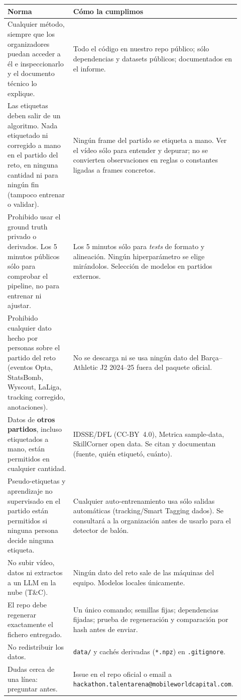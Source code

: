 \documentclass[11pt,a4paper]{article}
\begin{document}
\begin{longtable}{p{0.47\linewidth} p{0.45\linewidth}}
\toprule
\textbf{Norma} & \textbf{C\'omo la cumplimos} \\
\midrule
\endhead
Cualquier m\'etodo, siempre que los organizadores puedan acceder a \'el e inspeccionarlo y el
documento t\'ecnico lo explique. &
Todo el c\'odigo en nuestro repo p\'ublico; s\'olo dependencias y datasets p\'ublicos;
documentados en el informe. \\
\addlinespace
Las etiquetas deben salir de un algoritmo. Nada etiquetado ni corregido a mano en el partido del
reto, en ninguna cantidad ni para ning\'un fin (tampoco entrenar o validar). &
Ning\'un frame del partido se etiqueta a mano. Ver el v\'ideo s\'olo para entender y depurar; no se
convierten observaciones en reglas o constantes ligadas a frames concretos. \\
\addlinespace
Prohibido usar el ground truth privado o derivados. Los 5 minutos p\'ublicos s\'olo para comprobar
el pipeline, no para entrenar ni ajustar. &
Los 5 minutos s\'olo para \emph{tests} de formato y alineaci\'on. Ning\'un hiperpar\'ametro se
elige mir\'andolos. Selecci\'on de modelos en partidos externos. \\
\addlinespace
Prohibido cualquier dato hecho por personas sobre el partido del reto (eventos Opta, StatsBomb,
Wyscout, LaLiga, tracking corregido, anotaciones). &
No se descarga ni se usa ning\'un dato del Bar\c{c}a--Athletic J2 2024--25 fuera del paquete
oficial. \\
\addlinespace
Datos de \textbf{otros partidos}, incluso etiquetados a mano, est\'an permitidos en cualquier
cantidad. &
IDSSE/DFL (CC-BY~4.0), Metrica sample-data, SkillCorner open data. Se citan y documentan
(fuente, qui\'en etiquet\'o, cu\'anto). \\
\addlinespace
Pseudo-etiquetas y aprendizaje no supervisado en el partido est\'an permitidos si ninguna
persona decide ninguna etiqueta. &
Cualquier auto-entrenamiento usa s\'olo salidas autom\'aticas (tracking/Smart Tagging dados).
Se consultar\'a a la organizaci\'on antes de usarlo para el detector de bal\'on. \\
\addlinespace
No subir v\'ideo, datos ni extractos a un LLM en la nube (T\&C). &
Ning\'un dato del reto sale de las m\'aquinas del equipo. Modelos locales \'unicamente. \\
\addlinespace
El repo debe regenerar exactamente el fichero entregado. &
Un \'unico comando; semillas fijas; dependencias fijadas; prueba de regeneraci\'on y
comparaci\'on por hash antes de enviar. \\
\addlinespace
No redistribuir los datos. &
\texttt{data/} y cach\'es derivadas (\texttt{*.npz}) en \texttt{.gitignore}. \\
\addlinespace
Dudas cerca de una l\'inea: preguntar antes. &
Issue en el repo oficial o email a \texttt{hackathon.talentarena@mobileworldcapital.com}. \\
\bottomrule
\end{longtable}
\end{document}
